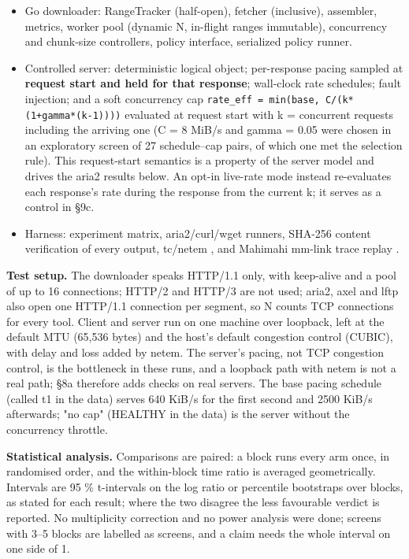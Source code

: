 \documentclass[conference]{IEEEtran}
\begin{document}
\begin{itemize}
\item Go downloader: RangeTracker (half-open), fetcher (inclusive), assembler, metrics, worker pool (dynamic N, in-flight ranges immutable), concurrency and chunk-size controllers, policy interface, serialized policy runner.
\item Controlled server: deterministic logical object; per-response pacing sampled at \textbf{request start and held for that response}; wall-clock rate schedules; fault injection; and a soft concurrency cap \texttt{rate\_eff = min(base, C/\allowbreak{}(k*(1+gamma*(k-1))))} evaluated at request start with k = concurrent requests including the arriving one (C = 8 MiB/s and gamma = 0.05 were chosen in an exploratory screen of 27 schedule–cap pairs, of which one met the selection rule). This request-start semantics is a property of the server model and drives the aria2 results below. An opt-in live-rate mode instead re-evaluates each response's rate during the response from the current k; it serves as a control in §9c.
\item Harness: experiment matrix, aria2/curl/wget runners, SHA-256 content verification of every output, tc/netem \cite{tcnetem}, and Mahimahi mm-link trace replay \cite{netravali2015mahimahi}.
\end{itemize}

\textbf{Test setup.} The downloader speaks HTTP/1.1 only, with keep-alive and a pool of up to 16 connections; HTTP/2 and HTTP/3 are not used; aria2, axel and lftp also open one HTTP/1.1 connection per segment, so N counts TCP connections for every tool. Client and server run on one machine over loopback, left at the default MTU (65,536 bytes) and the host's default congestion control (CUBIC), with delay and loss added by netem. The server's pacing, not TCP congestion control, is the bottleneck in these runs, and a loopback path with netem is not a real path; §8a therefore adds checks on real servers. The base pacing schedule (called t1 in the data) serves 640 KiB/s for the first second and 2500 KiB/s afterwards; "no cap" (HEALTHY in the data) is the server without the concurrency throttle.


\textbf{Statistical analysis.} Comparisons are paired: a block runs every arm once, in randomised order, and the within-block time ratio is averaged geometrically. Intervals are 95 \% t-intervals on the log ratio or percentile bootstraps over blocks, as stated for each result; where the two disagree the less favourable verdict is reported. No multiplicity correction and no power analysis were done; screens with 3–5 blocks are labelled as screens, and a claim needs the whole interval on one side of 1.
\end{document}
